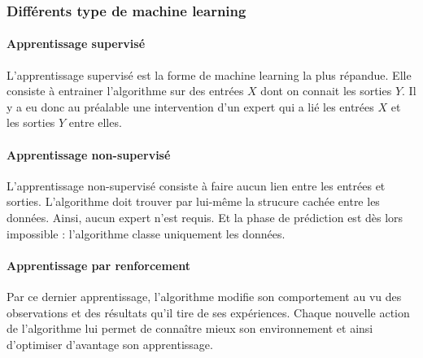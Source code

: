 \subsubsection{Différents type de machine learning}
\paragraph{Apprentissage supervisé}
L'apprentissage supervisé est la forme de machine learning la plus répandue. Elle consiste à entrainer l'algorithme sur des entrées $X$ dont on connait les sorties $Y$. Il y a eu donc au préalable une intervention d'un expert qui a lié les entrées $X$ et les sorties $Y$ entre elles.
\paragraph{Apprentissage non-supervisé}
L'apprentissage non-supervisé consiste à faire aucun lien entre les entrées et sorties. L'algorithme doit trouver par lui-même la strucure cachée entre les données. Ainsi, aucun expert n'est requis. Et la phase de prédiction est dès lors impossible : l'algorithme classe uniquement les données.
\paragraph{Apprentissage par renforcement}
Par ce dernier apprentissage, l'algorithme modifie son comportement au vu des observations et des résultats qu'il tire de ses expériences. Chaque nouvelle action de l'algorithme lui permet de connaître mieux son environnement et ainsi d'optimiser d'avantage son apprentissage.